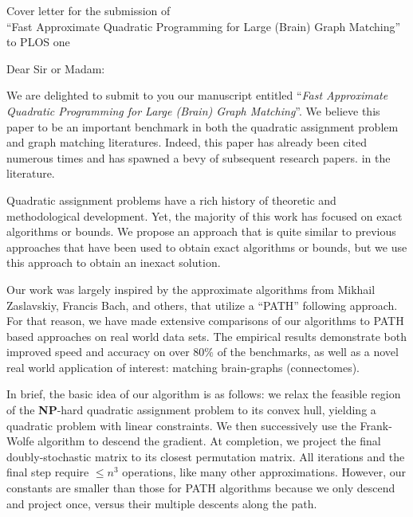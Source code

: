 \documentclass{letter}
\begin{document}
\address{Stieff Building\\
810 Wyman Park Drive}

\begin{letter}
{
Cover letter for the submission of 
\\
``Fast Approximate Quadratic Programming for Large (Brain) Graph Matching''
\\
to PLOS one
}

\date{\today}

\opening{Dear Sir or Madam:}

\bigskip
 
We are delighted to submit to you our manuscript entitled ``\emph{Fast Approximate Quadratic Programming for Large (Brain) Graph Matching}''.
We believe this paper to be an important benchmark in both the quadratic assignment problem and graph matching literatures.  Indeed, this paper has already been cited numerous times and has spawned a bevy of subsequent research papers.  in the literature.  

Quadratic assignment problems have a rich history of theoretic and methodological development.  Yet, the majority of this work has focused on exact algorithms or bounds.  We propose an approach that is quite similar to previous approaches that have been used to obtain exact algorithms or bounds, but we use this approach to obtain an inexact solution. 

Our work was largely inspired by the approximate algorithms 
from Mikhail Zaslavskiy, Francis Bach, and others,
that utilize a ``PATH'' following approach. For that reason, we have made extensive comparisons of our algorithms to PATH based approaches on real world data sets.  The empirical results demonstrate both improved speed and accuracy on over $80\%$ of the benchmarks, as well as a novel real world application of interest: matching brain-graphs (connectomes).

In brief, the basic idea of our algorithm is as follows: we relax the feasible region of the \textbf{NP}-hard quadratic assignment problem to its convex hull, yielding a quadratic problem with linear constraints.  We then successively use the Frank-Wolfe algorithm to descend the gradient.  At completion, we project the final doubly-stochastic matrix to its closest permutation matrix.  All iterations and the final step require $\leq n^3$ operations, like many other approximations.  However, our constants are smaller than those for PATH algorithms because we only descend and project once, versus their multiple descents along the path.  


\end{letter}
\end{document}
